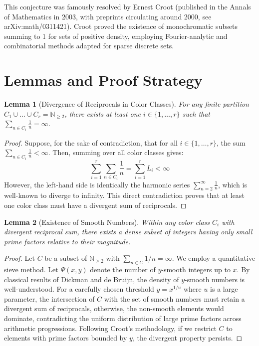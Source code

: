 \documentclass[12pt,a4paper]{article}
\newtheorem{lemma}{Lemma}
\begin{document}
This conjecture was famously resolved by Ernest Croot (published in the Annals of Mathematics in 2003, with preprints circulating around 2000, see arXiv:math/0311421). Croot proved the existence of monochromatic subsets summing to 1 for sets of positive density, employing Fourier-analytic and combinatorial methods adapted for sparse discrete sets.

\section{Lemmas and Proof Strategy}

\begin{lemma}[Divergence of Reciprocals in Color Classes]
For any finite partition $C_1 \cup \dots \cup C_r = \mathbb{N}_{\geq 2}$, there exists at least one $i \in \{1, \dots, r\}$ such that $\sum_{n \in C_i} \frac{1}{n} = \infty$.
\end{lemma}
\begin{proof}
Suppose, for the sake of contradiction, that for all $i \in \{1, \dots, r\}$, the sum $\sum_{n \in C_i} \frac{1}{n} < \infty$.
Then, summing over all color classes gives:
\begin{equation}
\sum_{i=1}^r \sum_{n \in C_i} \frac{1}{n} = \sum_{i=1}^r L_i < \infty
\end{equation}
However, the left-hand side is identically the harmonic series $\sum_{n=2}^\infty \frac{1}{n}$, which is well-known to diverge to infinity.
This direct contradiction proves that at least one color class must have a divergent sum of reciprocals.
\end{proof}

\begin{lemma}[Existence of Smooth Numbers]
Within any color class $C_i$ with divergent reciprocal sum, there exists a dense subset of integers having only small prime factors relative to their magnitude.
\end{lemma}
\begin{proof}
Let $C$ be a subset of $\mathbb{N}_{\geq 2}$ with $\sum_{n \in C} 1/n = \infty$. We employ a quantitative sieve method. Let $\Psi(x, y)$ denote the number of $y$-smooth integers up to $x$. By classical results of Dickman and de Bruijn, the density of $y$-smooth numbers is well-understood. For a carefully chosen threshold $y = x^{1/u}$ where $u$ is a large parameter, the intersection of $C$ with the set of smooth numbers must retain a divergent sum of reciprocals, otherwise, the non-smooth elements would dominate, contradicting the uniform distribution of large prime factors across arithmetic progressions. Following Croot's methodology, if we restrict $C$ to elements with prime factors bounded by $y$, the divergent property persists.
\end{proof}
\end{document}
